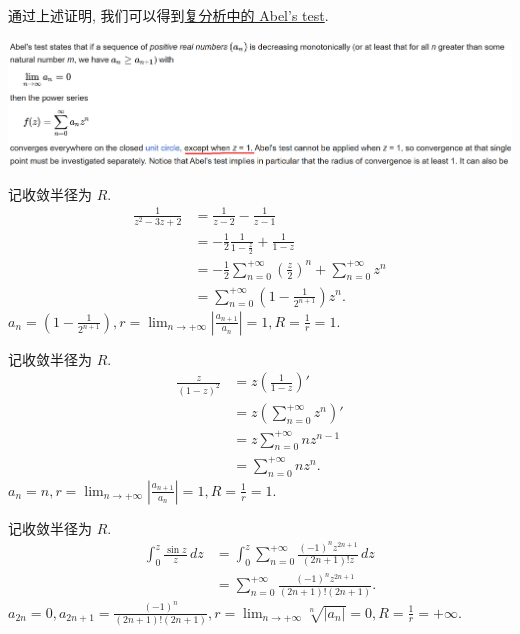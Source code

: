 \documentclass{homework}
\begin{document}
通过上述证明, 我们可以得到\href{https://en.wikipedia.org/wiki/Abel%27s_test#Abel's_test_in_real_analysis}{复分析中的 Abel's test}.

\begin{center}
  \includegraphics[width=.9\columnwidth]{figure/abel.png}
\end{center}

记收敛半径为 \(R\).
\begin{align*}
  \frac{1}{z^2-3z+2}&=\frac{1}{z-2}-\frac{1}{z-1}\\
  &=-\frac{1}{2}\frac{1}{1-\frac{z}{2}}+\frac{1}{1-z}\\
  &=-\frac{1}{2}\sum_{n=0}^{+\infty}\left(\frac{z}{2}\right)^n+\sum_{n=0}^{+\infty}z^n\\
  &=\sum_{n=0}^{+\infty}\left(1-\frac{1}{2^{n+1}}\right)z^n.
\end{align*}
\(a_n=(1-\frac{1}{2^{n+1}}), r=\lim_{n\to+\infty}|\frac{a_{n+1}}{a_n}|=1, R=\frac{1}{r}=1\).

记收敛半径为 \(R\).
\begin{align*}
  \frac{z}{(1-z)^2}&=z\left(\frac{1}{1-z}\right)'\\
  &=z\left(\sum_{n=0}^{+\infty}z^n\right)'\\
  &=z\sum_{n=0}^{+\infty}nz^{n-1}\\
  &=\sum_{n=0}^{+\infty}nz^n.
\end{align*}
\(a_n=n, r=\lim_{n\to+\infty}|\frac{a_{n+1}}{a_n}|=1, R=\frac{1}{r}=1\).

记收敛半径为 \(R\).
\begin{align*}
  \int_{0}^{z}\frac{\sin z}{z}\,dz&=\int_{0}^{z}\sum_{n=0}^{+\infty}\frac{(-1)^nz^{2n+1}}{(2n+1)!z}\,dz\\
  &=\sum_{n=0}^{+\infty}\frac{(-1)^nz^{2n+1}}{(2n+1)!(2n+1)}.
\end{align*}
\(a_{2n}=0, a_{2n+1}=\frac{(-1)^n}{(2n+1)!(2n+1)}, r=\lim_{n\to+\infty}\sqrt[n]{|a_n|}=0, R=\frac{1}{r}=+\infty\).

\end{document}
